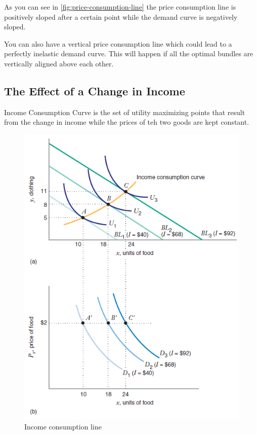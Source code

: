 \documentclass[../ECON-281-Notes.tex]{subfiles}
\begin{document}
As you can see in \cref{fig:price-consumption-line} the price consumption line is positively sloped after a certain point while the demand curve is negatively sloped.

You can also have a vertical price consumption line which could lead to a perfectly inelastic demand curve. This will happen if all the optimal bundles are vertically aligned above each other. 

\subsection{The Effect of a Change in Income}

\begin{Definition}
    {Income Consumption Curve}
    is the set of utility maximizing points that result from the change in income while the prices of teh two goods are kept constant. 
\end{Definition}

\begin{figure}[htbp]
    \centering
    \includegraphics[width=0.8\columnwidth]{../assets/income_consumption_line.png}
    \caption{Income consumption line}
    \label{fig:income_consumption_line}
\end{figure}
\end{document}
